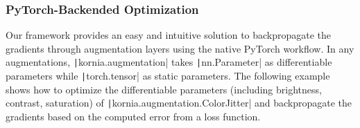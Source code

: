 \begin{tcolorbox}[every float=\centering, drop shadow, title=Example 1: DDA Pipeline]
    \label{fig:examples:pipeline}
    \inputminted[python3, baselinestretch=1., style=vs, fontfamily=courier, fontsize=\footnotesize, funcnamehighlighting=true]{python}{main/chapter03/data/dda/code/exp1_da_pip.py}
    \inputminted[python3, baselinestretch=1., style=vs, fontfamily=courier, fontsize=\footnotesize, funcnamehighlighting=true]{python}{main/chapter03/data/dda/code/exp1_on_device.py}
    \inputminted[python3, baselinestretch=1., style=vs, fontfamily=courier, fontsize=\footnotesize, funcnamehighlighting=true]{python}{main/chapter03/data/dda/code/exp1_sl.py}
\end{tcolorbox}

\subsubsection{PyTorch-Backended Optimization} \label{optimization}
Our framework provides an easy and intuitive solution to backpropagate the gradients through augmentation layers using the native PyTorch workflow. In any augmentations, \texttt|kornia.augmentation| takes \texttt|nn.Parameter| as differentiable parameters while \texttt|torch.tensor| as static parameters. The following example shows how to optimize the differentiable parameters (including brightness, contrast, saturation) of \texttt|kornia.augmentation.ColorJitter| and backpropagate the gradients based on the computed error from a loss function.

